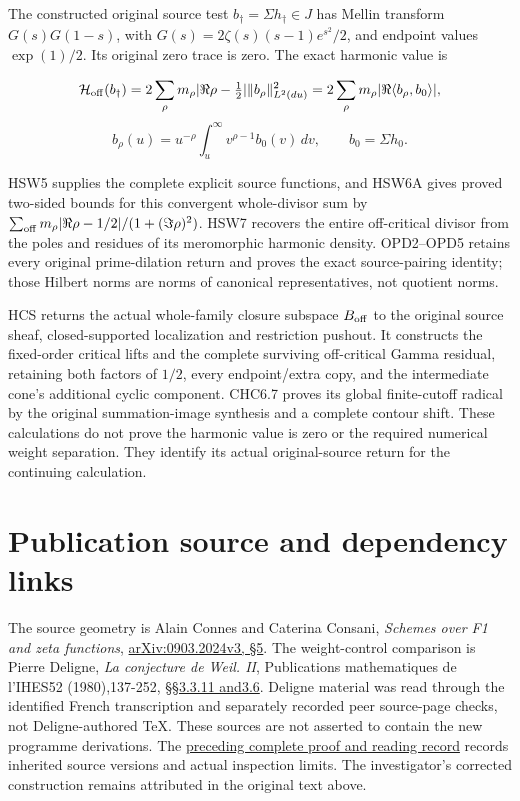 The constructed original source test \(b_\dagger=\Sigma h_\dagger\in J\)
has Mellin transform \(G(s)G(1-s)\), with
\(G(s)=2\zeta(s)(s-1)e^{s^2}/2\), and endpoint values \(\exp(1)/2\). Its
original zero trace is zero. The exact harmonic value is

\[
\mathcal H_{\rm off}(b_\dagger)=2\sum_\rho m_\rho|\Re\rho-\tfrac12|\|b_\rho\|_{L^2(du)}^2
=2\sum_\rho m_\rho|\Re\langle b_\rho,b_0\rangle|,
\] \[
b_\rho(u)=u^{-\rho}\int_u^\infty v^{\rho-1}b_0(v)\,dv,\qquad b_0=\Sigma h_0.
\]

HSW5 supplies the complete explicit source functions, and HSW6A gives
proved two-sided bounds for this convergent whole-divisor sum by
\(\sum_{\rm off}m_\rho|\Re\rho-1/2|/(1+(\Im\rho)^2)\). HSW7 recovers the
entire off-critical divisor from the poles and residues of its
meromorphic harmonic density. OPD2--OPD5 retains every original
prime-dilation return and proves the exact source-pairing identity;
those Hilbert norms are norms of canonical representatives, not quotient
norms.

HCS returns the actual whole-family closure subspace \(B_{\rm off}\) to
the original source sheaf, closed-supported localization and restriction
pushout. It constructs the fixed-order critical lifts and the complete
surviving off-critical Gamma residual, retaining both factors of
\(1/2\), every endpoint/extra copy, and the intermediate cone's
additional cyclic component. CHC6.7 proves its global finite-cutoff
radical by the original summation-image synthesis and a complete contour
shift. These calculations do not prove the harmonic value is zero or the
required numerical weight separation. They identify its actual
original-source return for the continuing calculation.

\section{Publication source and dependency
links}\label{publication-source-and-dependency-links-9}

The source geometry is Alain Connes and Caterina Consani, \emph{Schemes
over F1 and zeta functions},
\href{https://arxiv.org/abs/0903.2024v3}{arXiv:0903.2024v3, §5}. The
weight-control comparison is Pierre Deligne, \emph{La conjecture de
Weil. II}, Publications mathematiques de l'IHES52 (1980),137-252,
\href{https://www.numdam.org/item/PMIHES_1980__52__137_0/}{§§3.3.11
and3.6}. Deligne material was read through the identified French
transcription and separately recorded peer source-page checks, not
Deligne-authored TeX. These sources are not asserted to contain the new
programme derivations. The
\href{https://github.com/KokunoYumeto/zeta-function-research-reader/blob/36a82ecca98addb8a98b48204e349737856c7223/workbenches/splitzero-tandem/continuations/20260924-cohomology-weight-and-character-lifts/BUILD_AND_REVIEW.md}{preceding
complete proof and reading record} records inherited source versions and
actual inspection limits. The investigator's corrected construction
remains attributed in the original text above.

